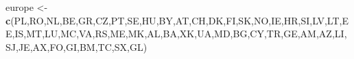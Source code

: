 \documentclass[
]{article}
\newenvironment{Shaded}{\begin{snugshade}}{\end{snugshade}}
\newcommand{\FunctionTok}[1]{\textcolor[rgb]{0.13,0.29,0.53}{\textbf{#1}}}
\newcommand{\NormalTok}[1]{#1}
\newcommand{\OtherTok}[1]{\textcolor[rgb]{0.56,0.35,0.01}{#1}}
\newcommand{\StringTok}[1]{\textcolor[rgb]{0.31,0.60,0.02}{#1}}
\begin{document}
\begin{Shaded}
\begin{Highlighting}[]
\NormalTok{europe }\OtherTok{\textless{}{-}} \FunctionTok{c}\NormalTok{(}\StringTok{\textquotesingle{}PL\textquotesingle{}}\NormalTok{,}\StringTok{\textquotesingle{}RO\textquotesingle{}}\NormalTok{,}\StringTok{\textquotesingle{}NL\textquotesingle{}}\NormalTok{,}\StringTok{\textquotesingle{}BE\textquotesingle{}}\NormalTok{,}\StringTok{\textquotesingle{}GR\textquotesingle{}}\NormalTok{,}\StringTok{\textquotesingle{}CZ\textquotesingle{}}\NormalTok{,}\StringTok{\textquotesingle{}PT\textquotesingle{}}\NormalTok{,}\StringTok{\textquotesingle{}SE\textquotesingle{}}\NormalTok{,}\StringTok{\textquotesingle{}HU\textquotesingle{}}\NormalTok{,}\StringTok{\textquotesingle{}BY\textquotesingle{}}\NormalTok{,}\StringTok{\textquotesingle{}AT\textquotesingle{}}\NormalTok{,}\StringTok{\textquotesingle{}CH\textquotesingle{}}\NormalTok{,}\StringTok{\textquotesingle{}DK\textquotesingle{}}\NormalTok{,}\StringTok{\textquotesingle{}FI\textquotesingle{}}\NormalTok{,}\StringTok{\textquotesingle{}SK\textquotesingle{}}\NormalTok{,}\StringTok{\textquotesingle{}NO\textquotesingle{}}\NormalTok{,}\StringTok{\textquotesingle{}IE\textquotesingle{}}\NormalTok{,}\StringTok{\textquotesingle{}HR\textquotesingle{}}\NormalTok{,}\StringTok{\textquotesingle{}SI\textquotesingle{}}\NormalTok{,}\StringTok{\textquotesingle{}LV\textquotesingle{}}\NormalTok{,}\StringTok{\textquotesingle{}LT\textquotesingle{}}\NormalTok{,}\StringTok{\textquotesingle{}EE\textquotesingle{}}\NormalTok{,}\StringTok{\textquotesingle{}IS\textquotesingle{}}\NormalTok{,}\StringTok{\textquotesingle{}MT\textquotesingle{}}\NormalTok{,}\StringTok{\textquotesingle{}LU\textquotesingle{}}\NormalTok{,}\StringTok{\textquotesingle{}MC\textquotesingle{}}\NormalTok{,}\StringTok{\textquotesingle{}VA\textquotesingle{}}\NormalTok{,}\StringTok{\textquotesingle{}RS\textquotesingle{}}\NormalTok{,}\StringTok{\textquotesingle{}ME\textquotesingle{}}\NormalTok{,}\StringTok{\textquotesingle{}MK\textquotesingle{}}\NormalTok{,}\StringTok{\textquotesingle{}AL\textquotesingle{}}\NormalTok{,}\StringTok{\textquotesingle{}BA\textquotesingle{}}\NormalTok{,}\StringTok{\textquotesingle{}XK\textquotesingle{}}\NormalTok{,}\StringTok{\textquotesingle{}UA\textquotesingle{}}\NormalTok{,}\StringTok{\textquotesingle{}MD\textquotesingle{}}\NormalTok{,}\StringTok{\textquotesingle{}BG\textquotesingle{}}\NormalTok{,}\StringTok{\textquotesingle{}CY\textquotesingle{}}\NormalTok{,}\StringTok{\textquotesingle{}TR\textquotesingle{}}\NormalTok{,}\StringTok{\textquotesingle{}GE\textquotesingle{}}\NormalTok{,}\StringTok{\textquotesingle{}AM\textquotesingle{}}\NormalTok{,}\StringTok{\textquotesingle{}AZ\textquotesingle{}}\NormalTok{,}\StringTok{\textquotesingle{}LI\textquotesingle{}}\NormalTok{,}\StringTok{\textquotesingle{}SJ\textquotesingle{}}\NormalTok{,}\StringTok{\textquotesingle{}JE\textquotesingle{}}\NormalTok{,}\StringTok{\textquotesingle{}AX\textquotesingle{}}\NormalTok{,}\StringTok{\textquotesingle{}FO\textquotesingle{}}\NormalTok{,}\StringTok{\textquotesingle{}GI\textquotesingle{}}\NormalTok{,}\StringTok{\textquotesingle{}BM\textquotesingle{}}\NormalTok{,}\StringTok{\textquotesingle{}TC\textquotesingle{}}\NormalTok{,}\StringTok{\textquotesingle{}SX\textquotesingle{}}\NormalTok{,}\StringTok{\textquotesingle{}GL\textquotesingle{}}\NormalTok{)}

\end{Highlighting}
\end{Shaded}
\end{document}
